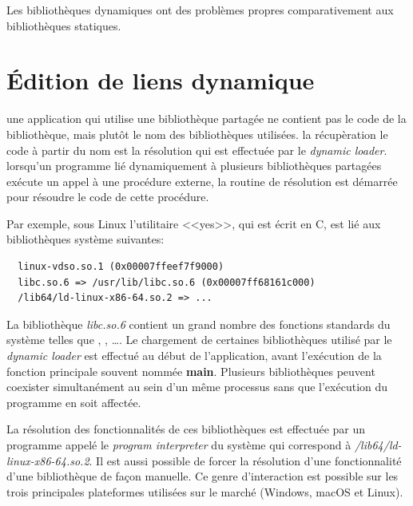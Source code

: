 Les bibliothèques dynamiques ont des problèmes propres comparativement aux
bibliothèques statiques.




\section{Édition de liens dynamique}

une application qui utilise une bibliothèque partagée ne contient pas le code
de la bibliothèque, mais plutôt le nom des bibliothèques utilisées. la
récupèration le code à partir du nom est la résolution qui est effectuée par le
\textit{dynamic loader}.  lorsqu'un programme lié dynamiquement à plusieurs
bibliothèques partagées exécute un appel à une procédure externe, la routine de
résolution est démarrée pour résoudre le code de cette procédure.

Par exemple, sous Linux l'utilitaire <<yes>>, qui est écrit en C,
est lié aux bibliothèques système suivantes:
\begin{verbatim}
  linux-vdso.so.1 (0x00007ffeef7f9000)
  libc.so.6 => /usr/lib/libc.so.6 (0x00007ff68161c000)
  /lib64/ld-linux-x86-64.so.2 => ...
\end{verbatim}

La bibliothèque \textit{libc.so.6} contient un grand nombre des fonctions
standards du système telles que , ,
\dots.  Le chargement de certaines bibliothèques utilisé par le \textit{dynamic
loader} est effectué au début de l'application, avant l'exécution de la fonction
principale souvent nommée \textbf{main}.  Plusieurs bibliothèques peuvent
coexister simultanément au sein d'un même processus sans que l'exécution du
programme en soit affectée.

La résolution des fonctionnalités de ces bibliothèques est effectuée par un
programme appelé le \textit{program interpreter} du système qui correspond à
\textit{/lib64/ld-linux-x86-64.so.2}.  Il est aussi possible de forcer la
résolution d'une fonctionnalité d'une bibliothèque de façon manuelle. Ce genre
d'interaction est possible sur les trois principales plateformes utilisées sur
le marché (Windows, macOS et Linux).

